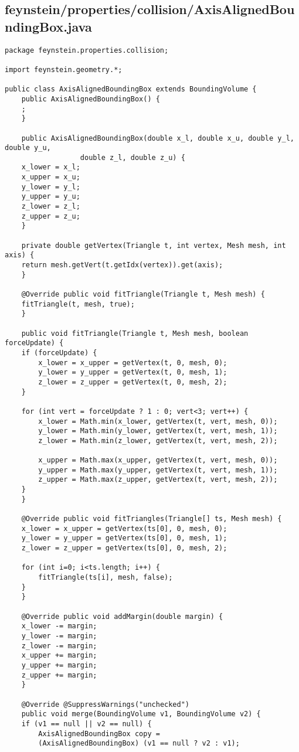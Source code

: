 \subsection*{feynstein/properties/collision/AxisAlignedBoundingBox.java}
\begin{lstlisting}
package feynstein.properties.collision;

import feynstein.geometry.*;

public class AxisAlignedBoundingBox extends BoundingVolume {
    public AxisAlignedBoundingBox() {
	;
    }

    public AxisAlignedBoundingBox(double x_l, double x_u, double y_l, double y_u,
				  double z_l, double z_u) {
	x_lower = x_l;
	x_upper = x_u;
	y_lower = y_l;
	y_upper = y_u;
	z_lower = z_l;
	z_upper = z_u;
    }

    private double getVertex(Triangle t, int vertex, Mesh mesh, int axis) {
	return mesh.getVert(t.getIdx(vertex)).get(axis);
    }

    @Override public void fitTriangle(Triangle t, Mesh mesh) {
	fitTriangle(t, mesh, true);
    }

    public void fitTriangle(Triangle t, Mesh mesh, boolean forceUpdate) {
	if (forceUpdate) {
	    x_lower = x_upper = getVertex(t, 0, mesh, 0);
	    y_lower = y_upper = getVertex(t, 0, mesh, 1);
	    z_lower = z_upper = getVertex(t, 0, mesh, 2);
	}

	for (int vert = forceUpdate ? 1 : 0; vert<3; vert++) {
	    x_lower = Math.min(x_lower, getVertex(t, vert, mesh, 0));
	    y_lower = Math.min(y_lower, getVertex(t, vert, mesh, 1));
	    z_lower = Math.min(z_lower, getVertex(t, vert, mesh, 2));

	    x_upper = Math.max(x_upper, getVertex(t, vert, mesh, 0));
	    y_upper = Math.max(y_upper, getVertex(t, vert, mesh, 1));
	    z_upper = Math.max(z_upper, getVertex(t, vert, mesh, 2));
	}
    }

    @Override public void fitTriangles(Triangle[] ts, Mesh mesh) {
	x_lower = x_upper = getVertex(ts[0], 0, mesh, 0);
	y_lower = y_upper = getVertex(ts[0], 0, mesh, 1);
	z_lower = z_upper = getVertex(ts[0], 0, mesh, 2);

	for (int i=0; i<ts.length; i++) {
	    fitTriangle(ts[i], mesh, false);
	}
    }

    @Override public void addMargin(double margin) {
	x_lower -= margin;
	y_lower -= margin;
	z_lower -= margin;
	x_upper += margin;
	y_upper += margin;
	z_upper += margin;
    }

    @Override @SuppressWarnings("unchecked")
    public void merge(BoundingVolume v1, BoundingVolume v2) {
	if (v1 == null || v2 == null) {
	    AxisAlignedBoundingBox copy = 
		(AxisAlignedBoundingBox) (v1 == null ? v2 : v1);
	    

\end{lstlisting}
